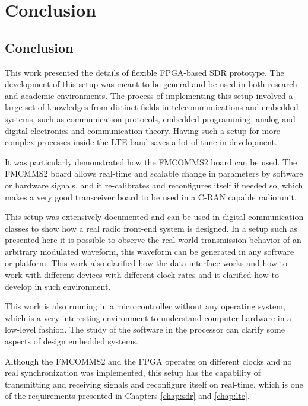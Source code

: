 \chapter{Conclusion}
\label{chap:conclusion}

\section{Conclusion}
\label{sec:conclusion}

This work presented the details of flexible FPGA-based SDR prototype. The
development of this setup was meant to be general and be used in both research
and academic environments. The process of implementing this setup involved a
large set of knowledges from distinct fields in telecommunications and embedded
systems, such as communication protocols, embedded programming, analog and
digital electronics and communication theory. Having such a setup for more
complex processes inside the LTE band saves a lot of time in development.

It was particularly demonstrated how the FMCOMMS2 board can be used. The FMCMMS2
board allows real-time and scalable change in parameters by software or hardware
signals, and it re-calibrates and reconfigures itself if needed so, which makes
a very good transceiver board to be used in a C-RAN capable radio unit.

This setup was extensively documented and can be used in digital communication
classes to show how a real radio front-end system is designed. In a setup such
as presented here it is possible to observe the real-world transmission behavior
of an arbitrary modulated waveform, this waveform can be generated in any
software or platform. This work also clarified how the data interface works and
how to work with different devices with different clock rates and it clarified
how to develop in such environment.

This work is also running in a microcontroller without any operating system,
which is a very interesting environment to understand computer hardware in a
low-level fashion. The study of the software in the processor can clarify some
aspects of design embedded systems.

Although the FMCOMMS2 and the FPGA operates on different clocks and no real
synchronization was implemented, this setup has the capability of transmitting
and receiving signals and reconfigure itself on real-time, which is one of the
requirements presented in Chapters \ref{chap:sdr} and \ref{chap:lte}.


